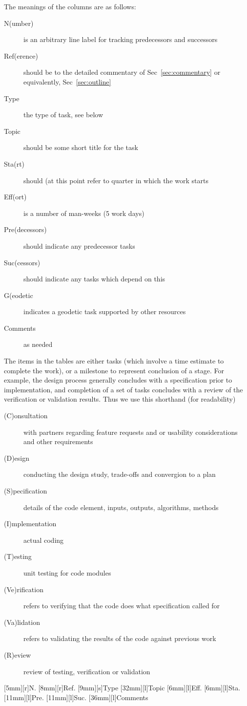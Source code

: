 The meanings of the columns are as follows:
\begin{description}
\item[N(umber)] is an arbitrary line label for tracking
predecessors and successors
\item[Ref(erence)] should be to the detailed commentary of
Sec~\ref{sec:commentary} or equivalently, Sec~\ref{sec:outline}
\item[Type] the type of task, see below
\item[Topic] should be some short title for the task
\item[Sta(rt)] should (at this point refer to quarter in which the work starts
\item[Eff(ort)] is a number of man-weeks (5 work days)
\item[Pre(decessors)] should indicate any predecessor tasks
\item[Suc(cessors)] should indicate any tasks which depend on this
\item[G(eodetic] indicates a geodetic task supported by other resources
\item[Comments] as needed
\end{description}
The items in the tables are either tasks (which involve a time estimate
to complete the work), or a milestone to represent conclusion of a stage.
For example, the design process generally concludes with a specification
prior to implementation, and completion of a set of tasks concludes with
a review of the verification or validation results. Thus we use this
shorthand (for readability)
\begin{description}
\item[(C)onsultation]
with partners regarding feature requests and or usability considerations
and other requirements
\item[(D)esign]
conducting the design study, trade-offs and convergion to a plan
\item[(S)pecification]
details of the code element, inputs, outputs, algorithms, methods
\item[(I)mplementation]
actual coding
\item[(T)esting]
unit testing for code modules
\item[(Ve)rification]
refers to verifying that the code does what specification called for
\item[(Va)lidation]
refers to validating the results of the code against previous work
\item[(R)eview]
review of testing, verification or validation
\end{description}
%
%
%
\newsavebox{\NM}
\savebox{\NM}[5mm][r]{N.}
\newsavebox{\REF}
\savebox{\REF}[8mm][r]{Ref.}
\newsavebox{\WW}
\savebox{\WW}[9mm][s]{Type}
\newsavebox{\TPC}
\savebox{\TPC}[32mm][l]{Topic}
\newsavebox{\EFF}
\savebox{\EFF}[6mm][l]{Eff.}
\newsavebox{\ST}
\savebox{\ST}[6mm][l]{Sta.}
\newsavebox{\PRD}
\savebox{\PRD}[11mm][l]{Pre.}
\newsavebox{\SCC}
\savebox{\SCC}[11mm][l]{Suc.}
\newsavebox{\CMTS}
\savebox{\CMTS}[36mm][l]{Comments}

